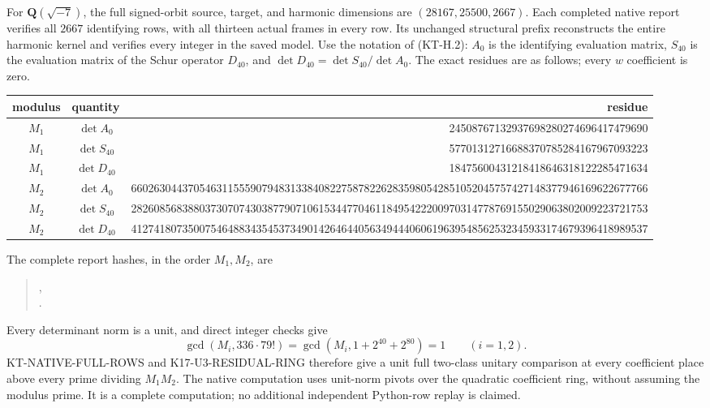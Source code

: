 \documentclass[11pt,a4paper]{article}
\theoremstyle{definition}
\begin{document}
For $\mathbf Q(\sqrt{-7})$, the full signed-orbit source, target,
and harmonic dimensions are $(28167,25500,2667)$.
Each completed native report verifies all $2667$ identifying
rows, with all thirteen actual frames in every row.
Its unchanged structural prefix reconstructs the entire harmonic
kernel and verifies every integer in the saved model.
Use the notation of (KT-H.2): $A_0$ is the identifying evaluation
matrix, $S_{40}$ is the evaluation matrix of the Schur operator
$D_{40}$, and $\det D_{40}=\det S_{40}/\det A_0$.
The exact residues are as follows; every $w$ coefficient is zero.
\begin{center}\scriptsize\setlength{\tabcolsep}{0.5pt}
\begin{tabular}{c|c|r}
modulus&quantity&residue\\\hline
$M_1$&$\det A_0$&24508767132937698280274696417479690\\
$M_1$&$\det S_{40}$&57701312716688370785284167967093223\\
$M_1$&$\det D_{40}$&18475600431218418646318122285471634\\
$M_2$&$\det A_0$&6602630443705463115559079483133840822758782262835980542851052045757427148377946169622677766\\
$M_2$&$\det S_{40}$&2826085683880373070743038779071061534477046118495422200970314778769155029063802009223721753\\
$M_2$&$\det D_{40}$&4127418073500754648834354537349014264644056349444060619639548562532345933174679396418989537
\end{tabular}
\end{center}
The complete report hashes, in the order $M_1,M_2$, are
\begin{quote}\small
{},\\
.
\end{quote}
Every determinant norm is a unit, and direct integer checks give
\[
 \gcd(M_i,336\cdot79!)=
 \gcd(M_i,1+2^{40}+2^{80})=1\qquad(i=1,2).                \tag{KF40.4}
\]
KT-NATIVE-FULL-ROWS and K17-U3-RESIDUAL-RING therefore give
a unit full two-class unitary comparison at every coefficient
place above every prime dividing $M_1M_2$.
The native computation uses unit-norm pivots over the quadratic
coefficient ring, without assuming the modulus prime.
It is a complete computation; no additional independent
Python-row replay is claimed.
\end{document}
